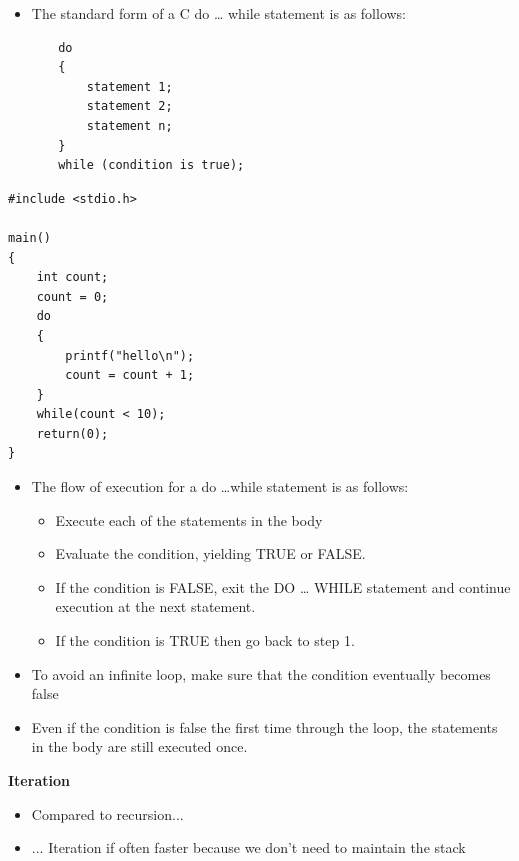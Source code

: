 \documentclass{beamer}
\begin{document}
\begin{frame}[fragile]
\begin{itemize}
\item The standard form of a C do {\dots} while statement is as follows:
\end{itemize}
\begin{block}{}
\begin{lstlisting}
       do
       {
           statement 1;
           statement 2;
           statement n;
       }
       while (condition is true);
\end{lstlisting}
\end{block}
\end{frame}

\begin{frame}[fragile]
\begin{block}{}
\begin{lstlisting}
#include <stdio.h>

main() 
{
    int count;
    count = 0;
    do 
    {
        printf("hello\n");
        count = count + 1;
    } 
    while(count < 10);
    return(0);
}
\end{lstlisting}
\end{block}
\end{frame}

\begin{frame} 
\begin{itemize}
\item The flow of execution for a do {\dots}while statement is as follows:
\begin{itemize}
\item Execute each of the statements in the body
\item Evaluate the condition, yielding TRUE or FALSE.
\item If the condition is FALSE, exit the DO {\dots} WHILE statement and continue execution at the next statement.
\item If the condition is TRUE then go back to step 1.
\end{itemize}
\item To avoid an infinite loop, make sure that the condition eventually becomes false
\item Even if the condition is false the first time through the loop, the statements in the body are still executed
once. \ 
\end{itemize}
 \end{frame}
 
\begin{frame} 
\begin{center}
\textbf{Iteration}
\end{center}
\begin{itemize}
\item Compared to recursion...
\item ... Iteration if often faster because we don't need to maintain the stack
\end{itemize}
\end{frame}
\end{document}
